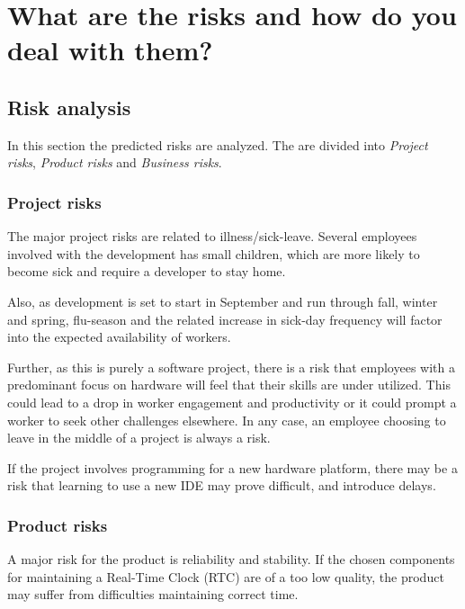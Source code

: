 \documentclass[Main]{subfiles}
\begin{document}
\section{What are the risks and how do you deal with them?}

	\subsection{Risk analysis} %
	\label{sub:risk_analysis}

	In this section the predicted risks are analyzed.
	The are divided into \emph{Project risks}, \emph{Product risks} and \emph{Business risks}.

		\subsubsection{Project risks} %
		\label{sub:project_risks}

		The major project risks are related to illness/sick-leave.
		Several employees involved with the development has small children, which are more likely to become sick and require a developer to stay home.

		Also, as development is set to start in September and run through fall, winter and spring, flu-season and the related increase in sick-day frequency will factor into the expected availability of workers.

		Further, as this is purely a software project, there is a risk that employees with a predominant focus on hardware will feel that their skills are under utilized. 
		This could lead to a drop in worker engagement and productivity or it could prompt a worker to seek other challenges elsewhere.
		In any case, an employee choosing to leave in the middle of a project is always a risk.

		If the project involves programming for a new hardware platform, there may be a risk that learning to use a new IDE may prove difficult, and introduce delays.


		\subsubsection{Product risks} %
		\label{sub:product_risks}

		A major risk for the product is reliability and stability.
		If the chosen components for maintaining a Real-Time Clock (RTC) are of a too low quality, the product may suffer from difficulties maintaining correct time.
\end{document}
